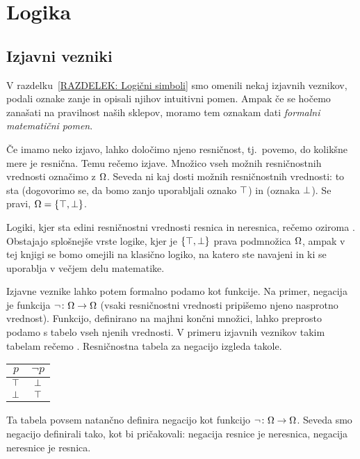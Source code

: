 \chapter{Logika}\label{POGLAVJE: Logika}

	
	
	\section{Izjavni vezniki}
	
		V razdelku~\ref{RAZDELEK: Logični simboli} smo omenili nekaj izjavnih veznikov, podali oznake zanje in opisali njihov intuitivni pomen. Ampak če se hočemo zanašati na pravilnost naših sklepov, moramo tem oznakam dati \emph{formalni matematični pomen}.
		
		Če imamo neko izjavo, lahko določimo njeno resničnost, tj.~povemo, do kolikšne mere je resnična. Temu rečemo  izjave. Množico vseh možnih resničnostnih vrednosti označimo z $\Omega$. Seveda ni kaj dosti možnih resničnostnih vrednosti: to sta  (dogovorimo se, da bomo zanjo uporabljali oznako $\top$) in  (oznaka $\bot$). Se pravi, $\tvs = \set{\true, \false}$.
		
		\begin{opomba}
			Logiki, kjer sta edini resničnostni vrednosti resnica in neresnica, rečemo  oziroma . Obstajajo splošnejše vrste logike, kjer je $\set{\true, \false}$ prava podmnožica $\Omega$, ampak v tej knjigi se bomo omejili na klasično logiko, na katero ste navajeni in ki se uporablja v večjem delu matematike.
		\end{opomba}
		
		
		Izjavne veznike lahko potem formalno podamo kot funkcije. Na primer, negacija je funkcija $\lnot\colon \Omega \to \Omega$ (vsaki resničnostni vrednosti pripišemo njeno nasprotno vrednost). Funkcijo, definirano na majhni končni množici, lahko preprosto podamo s tabelo vseh njenih vrednosti. V primeru izjavnih veznikov takim tabelam rečemo . Resničnostna tabela za negacijo izgleda takole.
		\begin{center}
			\begin{tabular}{c|c}
				$p$ & $\lnot{p}$ \\
				\hline
				$\top$ & $\bot$ \\
				$\bot$ & $\top$
			\end{tabular}
		\end{center}
		Ta tabela povsem natančno definira negacijo kot funkcijo $\lnot\colon \Omega \to \Omega$. Seveda smo negacijo definirali tako, kot bi pričakovali: negacija resnice je neresnica, negacija neresnice je resnica.
		
